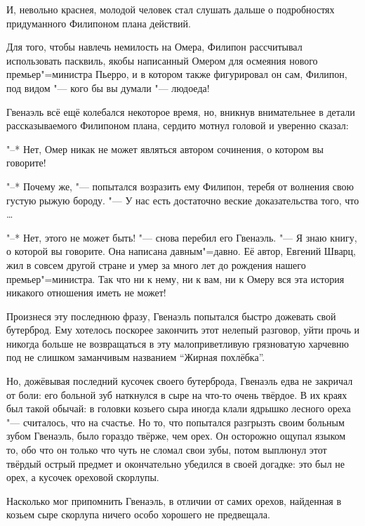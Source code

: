 И, невольно краснея, молодой человек стал слушать дальше о подробностях
придуманного Филипоном плана действий.

Для того, чтобы навлечь немилость на Омера, Филипон рассчитывал использовать
пасквиль, якобы написанный Омером для осмеяния нового премьер"=министра Пьерро,
и в котором также фигурировал он сам, Филипон, под видом "--- кого бы вы думали
"--- людоеда!

Гвенаэль всё ещё колебался некоторое время, но, вникнув внимательнее в детали
рассказываемого Филипоном плана, сердито мотнул головой и уверенно сказал:

"--* Нет, Омер никак не может являться автором сочинения, о котором вы говорите!

"--* Почему же, "--- попытался возразить ему Филипон, теребя от волнения свою
густую рыжую бороду.
"--- У нас есть достаточно веские доказательства того, что \ldots

"--* Нет, этого не может быть! "--- снова перебил его Гвенаэль.
"--- Я знаю книгу, о которой вы говорите.
Она написана давным"=давно.
Её автор, Евгений Шварц, жил в совсем другой стране и умер за много лет до
рождения нашего премьер"=министра.
Так что ни к нему, ни к вам, ни к Омеру вся эта история никакого отношения иметь
не может!

Произнеся эту последнюю фразу, Гвенаэль попытался быстро дожевать свой бутерброд.
Ему хотелось поскорее закончить этот нелепый разговор, уйти прочь и никогда
больше не возвращаться в эту малоприветливую грязноватую харчевню под не слишком
заманчивым названием \enquote{Жирная похлёбка}.

Но, дожёвывая последний кусочек своего бутерброда, Гвенаэль едва не закричал от
боли: его больной зуб наткнулся в сыре на что-то очень твёрдое.
В их краях был такой обычай: в головки козьего сыра иногда клали ядрышко лесного
ореха "--- считалось, что на счастье.
Но то, что попытался разгрызть своим больным зубом Гвенаэль, было гораздо
твёрже, чем орех.
Он осторожно ощупал языком то, обо что он только что чуть не сломал свои зубы,
потом выплюнул этот твёрдый острый предмет и окончательно убедился в своей
догадке: это был не орех, а кусочек ореховой скорлупы.

Насколько мог припомнить Гвенаэль, в отличии от самих орехов, найденная в козьем
сыре скорлупа ничего особо хорошего не предвещала.
